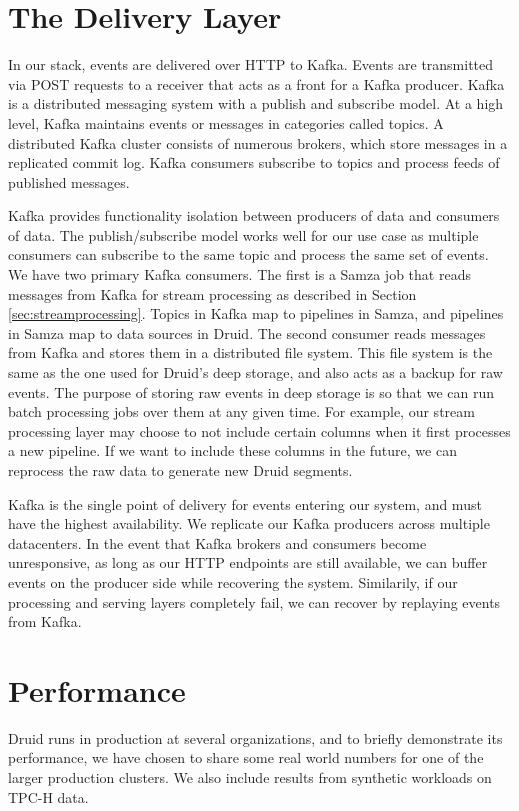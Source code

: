 \documentclass{vldb}
\begin{document}
\section{The Delivery Layer}
\label{sec:delivery}
In our stack, events are delivered over HTTP to Kafka. Events are transmitted
via POST requests to a receiver that acts as a front for a Kafka producer.
Kafka is a distributed messaging system with a publish and subscribe model. At
a high level, Kafka maintains events or messages in categories called topics. A
distributed Kafka cluster consists of numerous brokers, which store messages in
a replicated commit log. Kafka consumers subscribe to topics and process feeds
of published messages. 

Kafka provides functionality isolation between producers of data and consumers
of data. The publish/subscribe model works well for our use case as multiple
consumers can subscribe to the same topic and process the same set of events.
We have two primary Kafka consumers. The first is a Samza job that reads
messages from Kafka for stream processing as described in Section
\ref{sec:streamprocessing}. Topics in Kafka map to pipelines in Samza, and
pipelines in Samza map to data sources in Druid. The second consumer reads
messages from Kafka and stores them in a distributed file system.  This file
system is the same as the one used for Druid’s deep storage, and also acts as a
backup for raw events. The purpose of storing raw events in deep storage is so
that we can run batch processing jobs over them at any given time. For example,
our stream processing layer may choose to not include certain columns when it
first processes a new pipeline. If we want to include these columns in the
future, we can reprocess the raw data to generate new Druid segments.

Kafka is the single point of delivery for events entering our system, and must
have the highest availability. We replicate our Kafka producers across multiple
datacenters. In the event that Kafka brokers and consumers become unresponsive,
as long as our HTTP endpoints are still available, we can buffer events on the
producer side while recovering the system. Similarily, if our processing and
serving layers completely fail, we can recover by replaying events from Kafka.

\section{Performance}
\label{sec:performance}
Druid runs in production at several organizations, and to briefly demonstrate
its performance, we have chosen to share some real world numbers for one of the larger
production clusters. We also include results from synthetic workloads on TPC-H data.
\end{document}
